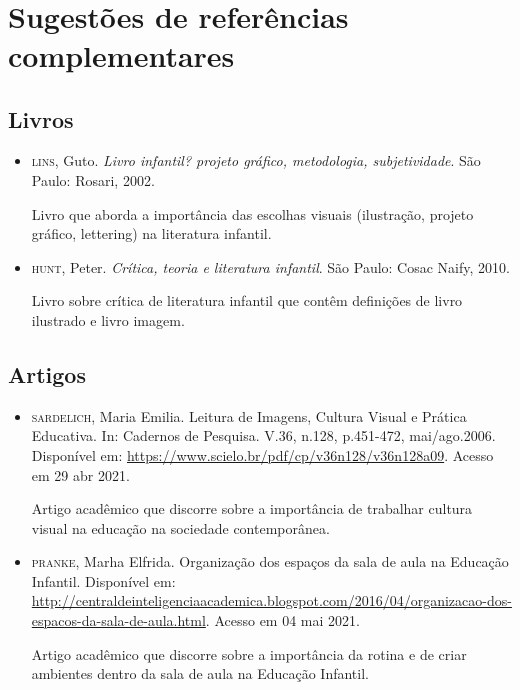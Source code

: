 \documentclass[11pt]{extarticle}
\begin{document}
 
\section{Sugestões de referências complementares}

\subsection{Livros} 

\begin{itemize}
\item \textsc{lins}, Guto. \textit{Livro infantil? projeto gráfico, metodologia, subjetividade}. São Paulo: Rosari, 2002.

Livro que aborda a importância das escolhas visuais (ilustração, projeto gráfico, lettering) na literatura infantil.  

\item \textsc{hunt}, Peter. \textit{Crítica, teoria e literatura infantil}. São Paulo: Cosac Naify, 2010.

Livro sobre crítica de literatura infantil que contêm definições de livro ilustrado e livro imagem. 
\end{itemize}

\subsection{Artigos}

\begin{itemize}
\item \textsc{sardelich}, Maria Emilia. Leitura de Imagens, Cultura Visual e Prática Educativa. 
In: Cadernos de Pesquisa. V.36, n.128, p.451-472, mai/ago.2006. Disponível em: \url{https://www.scielo.br/pdf/cp/v36n128/v36n128a09}. 
Acesso em 29 abr 2021. 

Artigo acadêmico que discorre sobre a importância de trabalhar cultura 
visual na educação na sociedade contemporânea. 

\item \textsc{pranke}, Marha Elfrida. Organização dos espaços da sala de aula na Educação Infantil. Disponível em: \url{http://centraldeinteligenciaacademica.blogspot.com/2016/04/organizacao-dos-espacos-da-sala-de-aula.html}. Acesso em 04 mai 2021. 

Artigo acadêmico que discorre sobre a importância da rotina e de criar ambientes dentro da sala de aula na Educação Infantil.  
\end{itemize}
\end{document}
